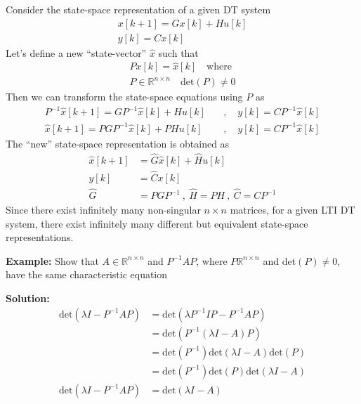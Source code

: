 \documentclass[twoside]{article}
\begin{document}
Consider the state-space representation of a 
given DT system
%
\begin{align*}
  x[k+1] = G x[k] + H u[k]
\\
  y[k] = C x[k] 
\end{align*}
%
Let's define a new ``state-vector'' $\hat{x}$ such that
%
\begin{align*}
  P x[k] = \hat{x}[k] \quad \mathrm{where}
\\
  P \in \mathbb{R}^{n \times n} \quad \mathrm{det}(P) \neq 0
\end{align*}
%
Then we can transform the state-space equations using $P$
as
%
\begin{align*}
  P^{-1} \hat{x}[k+1] = G P^{-1} \hat{x}[k] + H u[k] 
\quad &, \quad y[k] = C P^{-1} \hat{x}[k] 
\\
  \hat{x}[k+1] = P G P^{-1} \hat{x}[k] + P H u[k] 
\quad &, \quad y[k] = C P^{-1} \hat{x}[k] 
\end{align*}
%
The ``new'' state-space representation is obtained as
%
\begin{align*}
  \hat{x}[k+1] &= \hat{G} \hat{x}[k] + \hat{H} u[k] 
    \\
  y[k] &= \hat{C} x[k] 
\\
\hat{G} &= P  G P^{-1} \ , \ \hat{H} = P  H \ , \ \hat{C} = C P^{-1} 
\end{align*}
%
Since there exist infinitely many non-singular $n \times n$
matrices, for a given LTI DT system, there exist infinitely 
many different but equivalent state-space representations.

\vspace{24pt}

\textbf{Example:} Show that $A \in \mathbb{R}^{n \times n}$ and $P^{-1} A
P$, where $P \mathbb{R}^{n \times n}$ and $\mathrm{det}(P) \neq 0$, have the
same characteristic equation

\textbf{Solution:} 
\begin{align*}
  \mathrm{det}\left(\lambda I - P^{-1} A P \right) &= 
\mathrm{det}\left( \lambda P^{-1} I P - P^{-1} A P \right)
\\
&= \mathrm{det} \left( P^{-1} \left( \lambda I - A \right) P \right)
\\
&= \mathrm{det} \left( P^{-1} \right)
\mathrm{det} \left( \lambda I - A \right) 
\mathrm{det} \left( P \right)
\\
&= \mathrm{det} \left( P^{-1} \right) \mathrm{det} \left( P \right)
\mathrm{det} \left( \lambda I - A \right) 
\\
\mathrm{det}\left(\lambda I - P^{-1} A P \right) &= \mathrm{det} \left( \lambda I - A \right) 
\end{align*}
\end{document}
